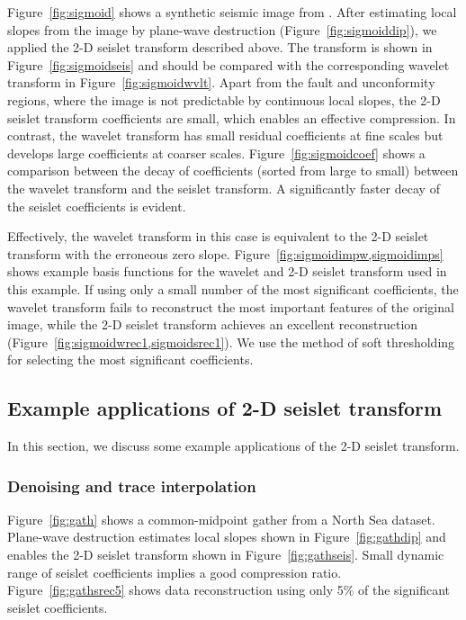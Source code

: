 Figure~\ref{fig:sigmoid} shows a synthetic seismic image from
\cite{bei}. After estimating local slopes from the image by plane-wave
destruction (Figure~\ref{fig:sigmoiddip}), we applied the 2-D seislet
transform described above. The transform is shown in
Figure~\ref{fig:sigmoidseis} and should be compared with the
corresponding wavelet transform in Figure~\ref{fig:sigmoidwvlt}.
Apart from the fault and unconformity regions, where the image is not
predictable by continuous local slopes, the 2-D seislet transform
coefficients are small, which enables an effective compression. In
contrast, the wavelet transform has small residual coefficients at
fine scales but develops large coefficients at coarser scales.
Figure~\ref{fig:sigmoidcoef} shows a comparison between the decay of
coefficients (sorted from large to small) between the wavelet
transform and the seislet transform. A significantly faster decay of
the seislet coefficients is evident.

Effectively, the wavelet transform in this case is equivalent to the
2-D seislet transform with the erroneous zero slope.
Figure~\ref{fig:sigmoidimpw,sigmoidimps} shows example basis functions
for the wavelet and 2-D seislet transform used in this example. If
using only a small number of the most significant coefficients, the
wavelet transform fails to reconstruct the most important features of
the original image, while the 2-D seislet transform achieves an
excellent reconstruction (Figure~\ref{fig:sigmoidwrec1,sigmoidsrec1}).
We use the method of soft thresholding \cite[]{donoho} for selecting
the most significant coefficients.

\subsection{Example applications of 2-D seislet transform}

In this section, we discuss some example applications of the 2-D seislet 
transform.

\subsubsection{Denoising and trace interpolation}


Figure~\ref{fig:gath} shows a common-midpoint gather from a North Sea
dataset. Plane-wave destruction estimates local slopes shown in
Figure~\ref{fig:gathdip} and enables the 2-D seislet transform shown
in Figure~\ref{fig:gathseis}. Small dynamic range of seislet
coefficients implies a good compression
ratio. Figure~\ref{fig:gathsrec5} shows data reconstruction using only
5\% of the significant seislet coefficients.

